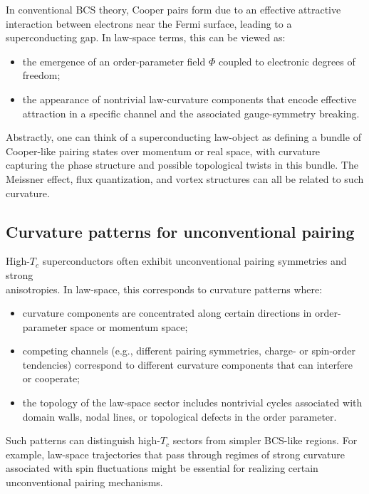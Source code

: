 \documentclass[11pt]{book}
\theoremstyle{plain}
\theoremstyle{definition}
\theoremstyle{remark}
\begin{document}
In conventional BCS theory, Cooper pairs form due to an effective
attractive interaction between electrons near the Fermi surface,
leading to a superconducting gap. In law-space terms, this can be
viewed as:
\begin{itemize}
  \item the emergence of an order-parameter field $\Phi$ coupled to
        electronic degrees of freedom;
  \item the appearance of nontrivial law-curvature components that
        encode effective attraction in a specific channel and the
        associated gauge-symmetry breaking.
\end{itemize}

Abstractly, one can think of a superconducting law-object as
defining a bundle of Cooper-like pairing states over momentum or
real space, with curvature capturing the phase structure and
possible topological twists in this bundle. The Meissner effect,
flux quantization, and vortex structures can all be related to
such curvature.

\subsection*{Curvature patterns for unconventional pairing}

High-$T_c$ superconductors often exhibit unconventional pairing
symmetries and strong \\anisotropies. In law-space, this corresponds
to curvature patterns where:
\begin{itemize}
  \item curvature components are concentrated along certain
        directions in order-parameter space or momentum space;
  \item competing channels (e.g., different pairing symmetries,
        charge- or spin-order tendencies) correspond to different
        curvature components that can interfere or cooperate;
  \item the topology of the law-space sector includes nontrivial
        cycles associated with domain walls, nodal lines, or
        topological defects in the order parameter.
\end{itemize}

Such patterns can distinguish high-$T_c$ sectors from simpler
BCS-like regions. For example, law-space trajectories that pass
through regimes of strong curvature associated with spin fluctuations
might be essential for realizing certain unconventional pairing
mechanisms.
\end{document}

